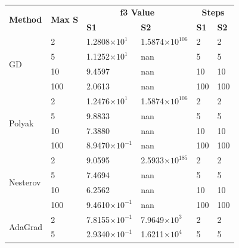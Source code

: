 \documentclass[9pt]{IEEEtran}
\begin{document}
\begin{table}[h!]
    \centering
    \begin{tabular}{|p{1cm}|p{1cm}|p{1.7cm}|p{1.7cm}|p{0.4cm}|p{0.4cm}|}
        \hline
        \multirow{2}{*}{\textbf{Method}} & \multirow{2}{*}{\textbf{Max S}} & \multicolumn{2}{c|}{\textbf{f3 Value}} & \multicolumn{2}{c|}{\textbf{Steps}} \\ \cline{3-4} \cline{5-6}
                                          &                                  & \textbf{S1} & \textbf{S2} & \textbf{S1} & \textbf{S2} \\ \hline
        \multirow{4}{*}{GD}              & 2  & 1.2808$\times 10^{1}$  & 1.5874$\times 10^{106}$  & 2  & 2 \\ \cline{2-6} 
                                       & 5  & 1.1252$\times 10^{1}$  & nan      & 5  & 5 \\ \cline{2-6} 
                                       & 10 & 9.4597  & nan      & 10 & 10 \\ \cline{2-6} 
                                       & 100 & 2.0613  & nan      & 100 & 100 \\ \hline
        \multirow{4}{*}{Polyak}       & 2  & 1.2476$\times 10^{1}$  & 1.5874$\times 10^{106}$  & 2  & 2 \\ \cline{2-6} 
                                       & 5  & 9.8833  & nan      & 5  & 5 \\ \cline{2-6} 
                                       & 10 & 7.3880  & nan      & 10 & 10 \\ \cline{2-6} 
                                       & 100 & 8.9470$\times 10^{-1}$  & nan      & 100 & 100 \\ \hline
        \multirow{4}{*}{Nesterov}     & 2  & 9.0595  & 2.5933$\times 10^{185}$  & 2  & 2 \\ \cline{2-6} 
                                       & 5  & 7.4694  & nan      & 5  & 5 \\ \cline{2-6} 
                                       & 10 & 6.2562  & nan      & 10 & 10 \\ \cline{2-6} 
                                       & 100 & 9.4610$\times 10^{-1}$  & nan      & 100 & 100 \\ \hline
        \multirow{4}{*}{AdaGrad}         & 2  & 7.8155$\times 10^{-1}$  & 7.9649$\times 10^{3}$   & 2  & 2 \\ \cline{2-6} 
                                       & 5  & 2.9340$\times 10^{-1}$  & 1.6211$\times 10^{4}$   & 5  & 5 \\ \cline{2-6} 

\end{tabular}
\end{table}
\end{document}
